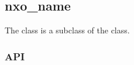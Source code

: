 %
%
%
%
%              

\subsection{nxo\_name}
\label{nxo_name}

The  class is a subclass of the  class.

\subsubsection{API}
